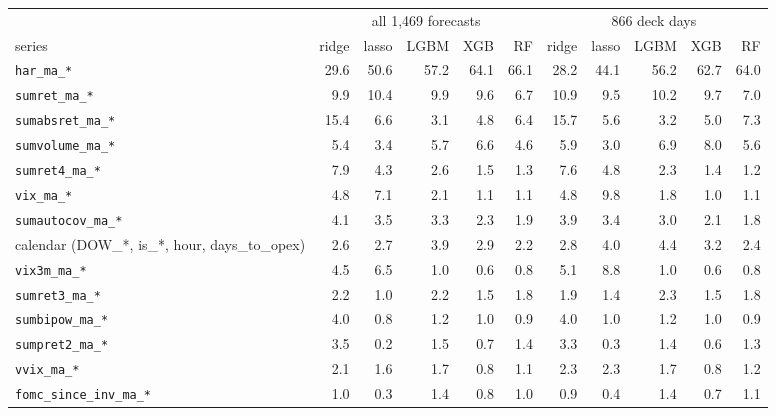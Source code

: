 \documentclass[10pt]{article}
\begin{document}
\begin{center}\scriptsize
{}
\setlength{\tabcolsep}{3.5pt}
\begin{tabular}{lrrrrrrrrrr}\toprule
 & \multicolumn{5}{c}{all 1,469 forecasts} & \multicolumn{5}{c}{866 deck days}\\
series & ridge & lasso & LGBM & XGB & RF & ridge & lasso & LGBM & XGB & RF \\\midrule
\texttt{har\_ma\_*} & 29.6 & 50.6 & 57.2 & 64.1 & 66.1 & 28.2 & 44.1 & 56.2 & 62.7 & 64.0 \\
\texttt{sumret\_ma\_*} & 9.9 & 10.4 & 9.9 & 9.6 & 6.7 & 10.9 & 9.5 & 10.2 & 9.7 & 7.0 \\
\texttt{sumabsret\_ma\_*} & 15.4 & 6.6 & 3.1 & 4.8 & 6.4 & 15.7 & 5.6 & 3.2 & 5.0 & 7.3 \\
\texttt{sumvolume\_ma\_*} & 5.4 & 3.4 & 5.7 & 6.6 & 4.6 & 5.9 & 3.0 & 6.9 & 8.0 & 5.6 \\
\texttt{sumret4\_ma\_*} & 7.9 & 4.3 & 2.6 & 1.5 & 1.3 & 7.6 & 4.8 & 2.3 & 1.4 & 1.2 \\
\texttt{vix\_ma\_*} & 4.8 & 7.1 & 2.1 & 1.1 & 1.1 & 4.8 & 9.8 & 1.8 & 1.0 & 1.1 \\
\texttt{sumautocov\_ma\_*} & 4.1 & 3.5 & 3.3 & 2.3 & 1.9 & 3.9 & 3.4 & 3.0 & 2.1 & 1.8 \\
calendar (DOW\_*, is\_*, hour, days\_to\_opex) & 2.6 & 2.7 & 3.9 & 2.9 & 2.2 & 2.8 & 4.0 & 4.4 & 3.2 & 2.4 \\
\texttt{vix3m\_ma\_*} & 4.5 & 6.5 & 1.0 & 0.6 & 0.8 & 5.1 & 8.8 & 1.0 & 0.6 & 0.8 \\
\texttt{sumret3\_ma\_*} & 2.2 & 1.0 & 2.2 & 1.5 & 1.8 & 1.9 & 1.4 & 2.3 & 1.5 & 1.8 \\
\texttt{sumbipow\_ma\_*} & 4.0 & 0.8 & 1.2 & 1.0 & 0.9 & 4.0 & 1.0 & 1.2 & 1.0 & 0.9 \\
\texttt{sumpret2\_ma\_*} & 3.5 & 0.2 & 1.5 & 0.7 & 1.4 & 3.3 & 0.3 & 1.4 & 0.6 & 1.3 \\
\texttt{vvix\_ma\_*} & 2.1 & 1.6 & 1.7 & 0.8 & 1.1 & 2.3 & 2.3 & 1.7 & 0.8 & 1.2 \\
\texttt{fomc\_since\_inv\_ma\_*} & 1.0 & 0.3 & 1.4 & 0.8 & 1.0 & 0.9 & 0.4 & 1.4 & 0.7 & 1.1 \\

\end{tabular}
\end{center}
\end{document}
